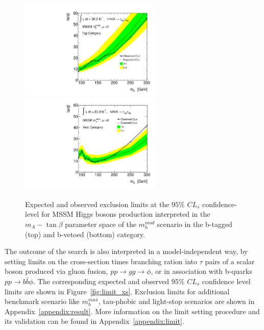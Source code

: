 \begin{figure}[tp]
  \centering
  \includegraphics[width=0.6\textwidth]{figure/limits/mhmod_tag.pdf}
  \includegraphics[width=0.6\textwidth]{figure/limits/mhmod_veto.pdf}
  \caption{Expected and observed  exclusion limits at the $95\%$ $CL_s$ confidence-level for MSSM Higgs bosons production 
   interpreted in the  $m_A - \tan\beta$ parameter space of the $m_h^{mod}$ scenario in the   b-tagged (top) and b-vetoed (bottom) category.}
\label{fig:limit_extract_combined2}
\end{figure}


The outcome of the search is also interpreted in a model-independent way, by setting  limits
on the cross-section times branching ration into $\tau$ pairs of a scalar boson produced via
gluon fusion, $pp \rightarrow gg \rightarrow \phi$,  or in association with b-quarks  $pp \rightarrow b\bar{b}\phi$.
The corresponding expected and observed $95\%$ $CL_s$ confidence level  limits are shown in Figure~\ref{fig:limit_xs}.
Exclusion limits for additional benchmark scenario like $m_h^{max}$, tau-phobic and light-stop scenarios are shown in Appendix~\ref{appendix:result}.
More information on the limit setting procedure and its validation can be found in Appendix~\ref{appendix:limit}.

